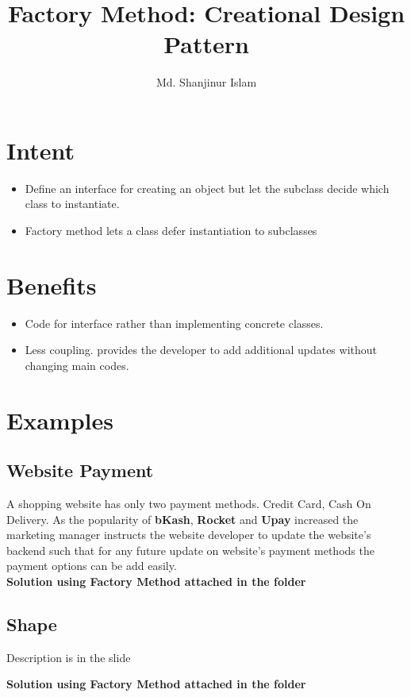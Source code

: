 \documentclass{article}
\title{Factory Method: Creational Design Pattern}
\author{Md. Shanjinur Islam}
\begin{document}
	\maketitle
	\newpage
	\section{Intent}
		\begin{itemize}
			\item Define an interface for creating an object but let the subclass decide which class to instantiate.
			\item Factory method lets a class defer instantiation to subclasses
		\end{itemize}
	\section{Benefits}
		
		\begin{itemize}
			\item Code for interface rather than implementing concrete classes.
			\item Less coupling. provides the developer to add additional updates without changing main codes.
		\end{itemize}
	
	\section{Examples}

		\subsection{Website Payment}
			
			A shopping website has only two payment methods. Credit Card, Cash On Delivery. As the popularity
			of \textbf{bKash}, \textbf{Rocket} and \textbf{Upay} increased the marketing manager instructs the website developer to update the website's
			backend such that for any future update on website's payment methods the payment options can be add easily.\\

		\textbf{Solution using Factory Method attached in the folder}

		\subsection{Shape}
			
			Description is in the slide

		\textbf{Solution using Factory Method attached in the folder}
 		
	
\end{document}

